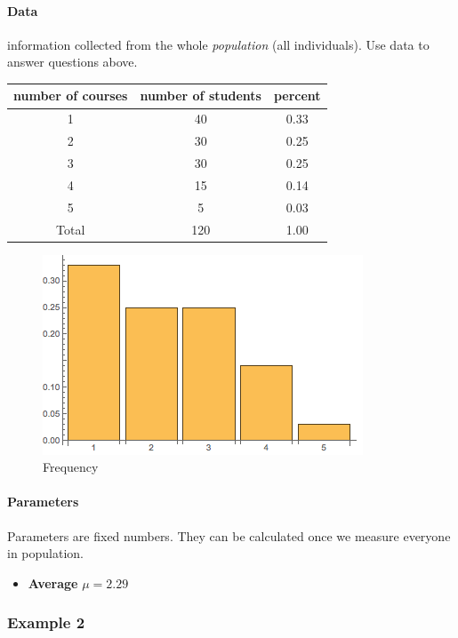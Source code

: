\documentclass[11pt]{article}
\begin{document}
	\paragraph{Data} information collected from the whole \emph{population} (all individuals). Use data to answer questions above.
	
	\begin{center}
		\begin{tabular}{|c|c|c|}
			\hline
			number of courses & number of students & percent \\
			\hline \hline
			1 & 40 & 0.33 \\
			\hline
			2 & 30 & 0.25 \\
			\hline
			3 & 30 & 0.25 \\
			\hline
			4 & 15 & 0.14 \\
			\hline
			5 & 5 & 0.03 \\
			\hline
			Total & 120 & 1.00 \\
			\hline
		\end{tabular}	
	\end{center}
	
	\begin{figure}[h]
		\centering
		\includegraphics[width=0.7\linewidth]{eco220pic/fig1}
		\caption{Frequency}
	\end{figure}
	
	\paragraph{Parameters} Parameters are fixed numbers. They can be calculated once we measure everyone in population.
	\newline
	\begin{itemize}
		\item \textbf{Average} $\mu = 2.29$
	\end{itemize}

\subsubsection{Example 2} 
\end{document}
